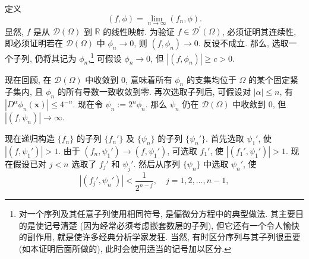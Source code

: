 \begin{Proof}
定义
\begin{equation}\label{eq:distribution-pointwise-pairing-limit}
(f,\phi)=\lim_{n\to\infty}(f_n,\phi).
\end{equation}
显然, $f$ 是从 $\mathcal{D}(\Omega)$ 到 $\mathbb{R}$ 的线性映射. 为验证 $f\in\mathcal{D}^{\prime}(\Omega)$, 必须证明其连续性, 即必须证明若在 $\mathcal{D}(\Omega)$ 中 $\phi_n\to0$, 则 $(f,\phi_n)\to0$. 反设不成立. 那么, 选取一个子列, 仍将其记为 $\phi_n$,\footnote{对一个序列及其任意子列使用相同符号, 是偏微分方程中的典型做法. 其主要目的是使记号清楚 (因为经常必须考虑嵌套数层的子列), 但它还有一个令人愉快的副作用, 就是使许多经典分析学家发狂. 当然, 有时区分序列与其子列很重要 (如本证明后面所做的), 此时会使用适当的记号加以区分.} 可假设 $\phi_n\to0$, 但 $|(f,\phi_n)|\geq c>0$.

现在回顾, 在 $\mathcal{D}(\Omega)$ 中收敛到 0, 意味着所有 $\phi_n$ 的支集均位于 $\Omega$ 的某个固定紧子集内, 且 $\phi_n$ 的所有导数一致收敛到零. 再次选取子列后, 可假设对 $|\alpha|\leq n$, 有 $|D^\alpha\phi_n(\bm{x})|\leq4^{-n}$. 现在令 $\psi_n:=2^n\phi_n$. 那么 $\psi_n$ 仍在 $\mathcal{D}(\Omega)$ 中收敛到 0, 但 $|(f,\psi_n)|\to\infty$.

现在递归构造 $\{f_n\}$ 的子列 $\{f_n'\}$ 及 $\{\psi_n\}$ 的子列 $\{\psi_n'\}$. 首先选取 $\psi_1'$, 使 $|(f,\psi_1')|>1$. 由于 $(f_n,\psi_1')\to(f,\psi_1')$, 可选取 $f_1'$, 使 $|(f_1',\psi_1')|>1$. 现在假设已对 $j<n$ 选取了 $f_j'$ 和 $\psi_j'$. 然后从序列 $\{\psi_n\}$ 中选取 $\psi_n'$, 使
\begin{equation}\label{eq:distribution-completeness-small-earlier-pairings}
|(f_j',\psi_n')|<\dfrac1{2^{n-j}},\quad j=1,2,\ldots,n-1,
\end{equation}


\end{Proof}
